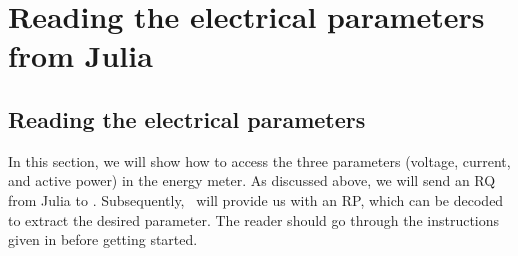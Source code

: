 


\section{Reading the electrical parameters from Julia}
\subsection{Reading the electrical parameters}
In this section, we will show how to access the three parameters (voltage, current, and active power) in the energy meter. As discussed above, we will send an RQ from Julia to \arduino. Subsequently, \arduino\ will provide us with an RP, which can be decoded to extract the desired parameter. The reader should go through the instructions given in  before getting started.

